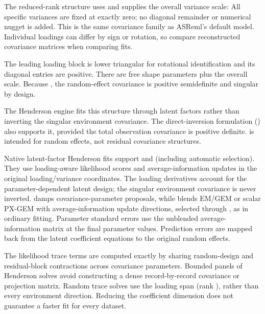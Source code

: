 \documentclass[a4paper]{book}
\begin{document}
\begin{Details}\relax
The reduced-rank structure uses
and  supplies the overall variance scale:
All specific variances are fixed at exactly zero; no diagonal remainder or
numerical nugget is added. This is the same covariance family as ASReml's
default  model. Individual loadings can differ by sign or
rotation, so compare reconstructed covariance matrices when comparing fits.

The leading  loading block is lower triangular for rotational
identification and its diagonal entries are positive. There are
 free shape parameters plus the overall scale.
Because , the random-effect covariance is positive semidefinite
and singular by design.

The Henderson engine fits this structure through latent factors rather than
inverting the singular environment covariance. The direct-inversion formulation
() also supports it, provided the total observation
covariance is positive definite.  is intended for random effects,
not residual covariance structures.

Native latent-factor Henderson fits support  and
 (including automatic selection). They use
loading-aware likelihood scores and average-information updates in the
original loading/variance coordinates. The loading derivatives account for
the parameter-dependent latent design; the singular environment covariance
is never inverted.  damps covariance-parameter proposals,
while  blends EM/GEM or scalar PX-GEM with
average-information update directions, selected through ,
as in ordinary  fitting. Parameter standard errors use the unblended
average-information matrix at the final parameter values.
Prediction errors are mapped back from the latent coefficient equations
to the original random effects.

The likelihood trace terms are computed exactly by sharing random-design
and residual-block contractions across covariance parameters. Bounded panels
of Henderson solves avoid constructing a dense record-by-record covariance
or projection matrix. Random trace solves use the loading span (rank ),
rather than every environment direction. Reducing the coefficient dimension does not guarantee
a faster fit for every dataset.


\end{Details}
\end{document}
